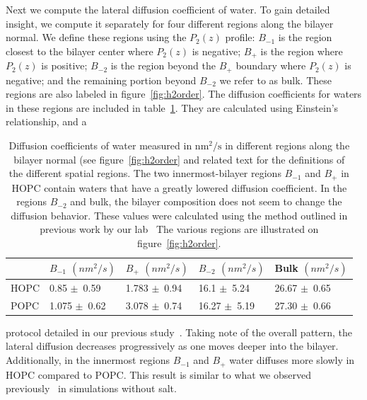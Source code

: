 \documentclass[12pt,openany,final]{book}
\newcommand{\PM}{$\pm$~}
\begin{document}
Next we compute the lateral diffusion coefficient of water. To gain detailed insight, we compute it 
separately for four different regions along the bilayer normal. We define these regions 
using the $P_2(z)$ profile: $B_{-1}$ is the region closest to the bilayer center where 
$P_2(z)$ is negative; $B_{+}$ is the region where $P_2(z)$ 
is positive; $B_{-2}$ is the region beyond the $B_{+}$ boundary where $P_2(z)$ is 
negative; and the remaining portion beyond $B_{-2}$ we refer to as bulk. 
These regions are also labeled in figure~\ref{fig:h2order}. The diffusion coefficients for waters 
in these regions are included in table~\ref{tab:diff}. They are calculated using Einstein's relationship, and a 
\begin{table}[t]
\caption[Diffusion coefficients of water measured in $\text{nm}^2/\text{s}$ in different regions along the bilayer normal (see figure~\ref{fig:h2order} 
and related text for the definitions of the different spatial regions.]{
Diffusion coefficients of water measured in $\text{nm}^2/\text{s}$ in different regions along the bilayer normal (see figure~\ref{fig:h2order} 
and related text for the definitions of the different spatial regions.
The two innermost-bilayer regions $B_{-1}$ and $B_+$ in HOPC contain waters that have a greatly lowered diffusion coefficient. In the regions $B_{-2}$ and bulk, 
the bilayer composition does not seem to change the diffusion behavior. These values were calculated using the method outlined in previous work by our lab~\cite{kruczek:2017:ether}
The various regions are illustrated on figure~\ref{fig:h2order}.
}
\label{tab:diff}
\begin{tabularx}{\textwidth}{X|X|X|X|X|}%
& $B_{-1}$ $(nm^2/s)$ & $B_+$ $(nm^2/s)$ & $B_{-2}$ $(nm^2/s)$ & Bulk $(nm^2/s)$\\ \hline
HOPC & 0.85 \PM 0.59 & 1.783 \PM 0.94 & 16.1 \PM 5.24 & 26.67 \PM 0.65 \\
POPC & 1.075 \PM 0.62 & 3.078 \PM 0.74 & 16.27 \PM 5.19 & 27.30 \PM 0.66 \\
\end{tabularx}
\end{table}
protocol detailed in our previous study~\cite{kruczek:2017:ether}. Taking note of the overall pattern, the 
lateral diffusion decreases progressively as one moves deeper into the bilayer. Additionally, in the innermost 
regions $B_{-1}$ and  $B_+$ water diffuses more slowly in HOPC compared to POPC. This result 
is similar to what we observed previously~\cite{kruczek:2017:ether} in simulations without salt.
\end{document}
